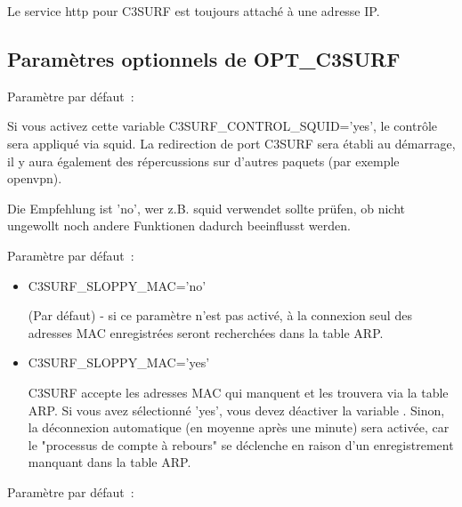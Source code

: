 \begin{itemize}
\begin{description}
Le service http pour C3SURF est toujours attaché à une adresse IP.

\end{description}

\subsection {Paramètres optionnels de OPT\_C3SURF}

\begin{description}


  Paramètre par défaut~: 

  Si vous activez cette variable C3SURF\_CONTROL\_SQUID='yes', le contrôle
  sera appliqué via squid. La redirection de port C3SURF sera établi au démarrage,
  il y aura également des répercussions sur d'autres paquets (par exemple openvpn).

  Die Empfehlung ist 'no', wer z.B. squid verwendet sollte prüfen, ob nicht
  ungewollt noch andere Funktionen dadurch beeinflusst werden.


  Paramètre par défaut~: 

   \begin{itemize}
      \item{C3SURF\_SLOPPY\_MAC='no'}

            (Par défaut) - si ce paramètre n'est pas activé, à la connexion
			seul des adresses MAC enregistrées seront recherchées dans la table ARP.

       \item{C3SURF\_SLOPPY\_MAC='yes'}

            C3SURF accepte les adresses MAC qui manquent et les trouvera via la table ARP.
			Si vous avez sélectionné 'yes', vous devez déactiver la variable
			. Sinon, la déconnexion automatique
			(en moyenne après une minute) sera activée, car le "processus de compte à rebours" se
			déclenche en raison d'un enregistrement manquant dans la table ARP.
   \end{itemize}


  Paramètre par défaut~: 


\end{description}
\end{itemize}
